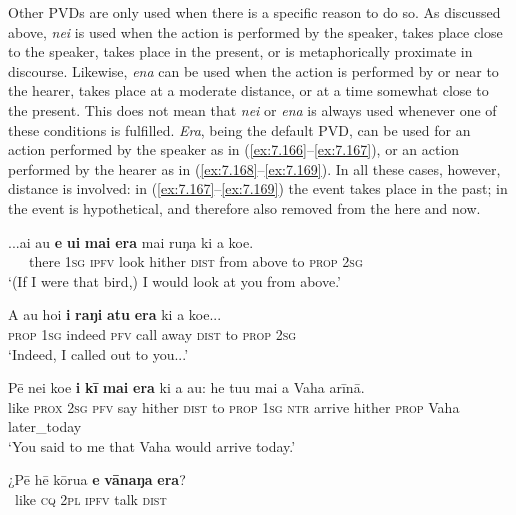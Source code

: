Other PVDs are only used when there is a specific reason to do so. As discussed above, \textit{nei} is used when the action is performed by the speaker, takes place close to the speaker, takes place in the present, or is metaphorically proximate in discourse. Likewise, \textit{ena} can be used when the action is performed by or near to the hearer, takes place at a moderate distance, or at a time somewhat close to the present. This does not mean that \textit{nei} or \textit{ena} is always used whenever one of these conditions is fulfilled. \textit{Era}, being the default PVD, can be used for an action performed by the speaker as in (\ref{ex:7.166}–\ref{ex:7.167}), or an action performed by the hearer as in (\ref{ex:7.168}–\ref{ex:7.169}). In all these cases, however, distance is involved: in (\ref{ex:7.167}–\ref{ex:7.169}) the event takes place in the past; in  the event is hypothetical, and therefore also removed from the here and now.

\ea\label{ex:7.166}
\gll ...{\ꞌ}ai au \textbf{e} \textbf{u{\ꞌ}i} \textbf{mai} \textbf{era} mai ruŋa ki a koe. \\
~~~there \textsc{1sg} \textsc{ipfv} look hither \textsc{dist} from above to \textsc{prop} \textsc{2sg} \\

\glt 
‘(If I were that bird,) I would look at you from above.’ \textstyleExampleref{[R245.155]} 
\z

\ea\label{ex:7.167}
\gll A au ho{\ꞌ}i \textbf{i} \textbf{raŋi} \textbf{atu} \textbf{era} ki a koe... \\
\textsc{prop} \textsc{1sg} indeed \textsc{pfv} call away \textsc{dist} to \textsc{prop} \textsc{2sg} \\

\glt 
‘Indeed, I called out to you...’ \textstyleExampleref{[R229.499]} 
\z

\ea\label{ex:7.168}
\gll Pē nei koe \textbf{i} \textbf{kī} \textbf{mai} \textbf{era} ki a au: he tu{\ꞌ}u mai a Vaha {\ꞌ}arīnā. \\
like \textsc{prox} \textsc{2sg} \textsc{pfv} say hither \textsc{dist} to \textsc{prop} \textsc{1sg} \textsc{ntr} arrive hither \textsc{prop} Vaha later\_today \\

\glt 
‘You said to me that Vaha would arrive today.’ \textstyleExampleref{[R229.147]} 
\z

\ea\label{ex:7.169}
\gll ¿Pē hē kōrua \textbf{e} \textbf{vānaŋa} \textbf{era}? \\
~like \textsc{cq} \textsc{2pl} \textsc{ipfv} talk \textsc{dist} \\

